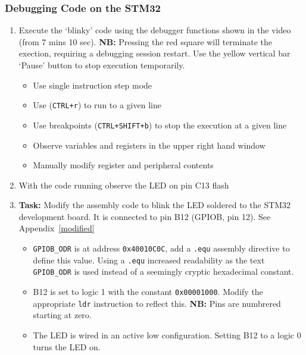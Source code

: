 \documentclass{UoNMCHA}
\numberwithin{equation}{section}
\begin{document}
\pagebreak

\subsubsection{Debugging Code on the STM32}

\begin{enumerate}
    \item Execute the `blinky' code using the debugger functions shown in the video (from 7 mins 10 sec). \textbf{NB:} Pressing the red square will terminate the exection, requiring a debugging session restart. Use the yellow vertical bar `Pause' button to stop execution temporarily.
    
    \begin{itemize}
        \item Use single instruction step mode
        \item Use (\texttt{CTRL+r}) to run to a given line
        \item Use breakpoints (\texttt{CTRL+SHIFT+b}) to stop the execution at a given line
        \item Observe variables and registers in the upper right hand window
        \item Manually modify register and peripheral contents
    \end{itemize}
    
    \item With the code running observe the LED on pin C13 flash
    
    \item \textbf{Task:} Modify the assembly code to blink the LED soldered to the STM32 development board. It is connected to pin B12 (GPIOB, pin 12). See Appendix~\ref{modified}
    \begin{itemize}
        \item \texttt{GPIOB\_ODR} is at address \texttt{0x40010C0C}, add a \texttt{.equ} assembly directive to define this value. Using a \texttt{.equ} increased readability as the text \texttt{GPIOB\_ODR} is used instead of a seemingly cryptic hexadecimal constant.
        \item B12 is set to logic 1 with the constant \texttt{0x00001000}. Modify the appropriate \texttt{ldr} instruction to reflect this. \textbf{NB:} Pins are numbrered starting at zero.
        
        \item The LED is wired in an active low configuration. Setting B12 to a logic 0 turns the LED on.
    \end{itemize}
\end{enumerate}
\end{document}
